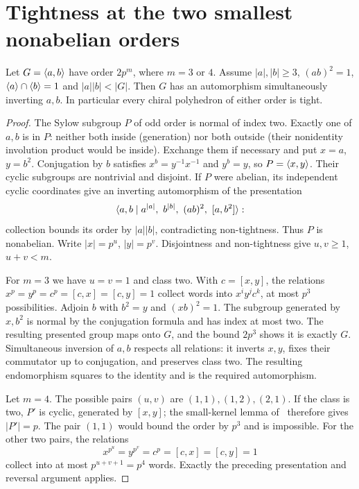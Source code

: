 \section{Tightness at the two smallest nonabelian orders}
\begin{theorem}\label{thm:small}
Let $G=\langle a,b\rangle$ have order $2p^m$, where $m=3$ or $4$.
Assume $|a|,|b|\geq3$, $(ab)^2=1$,
$\langle a\rangle\cap\langle b\rangle=1$ and $|a||b|<|G|$.
Then $G$ has an automorphism simultaneously inverting $a,b$.
In particular every chiral polyhedron of either order is tight.
\end{theorem}
\begin{proof}
The Sylow subgroup $P$ of odd order is normal of index two.
Exactly one of $a,b$ is in $P$: neither both inside (generation)
nor both outside (their nonidentity involution product would be
inside). Exchange them if necessary and put $x=a$, $y=b^2$.
Conjugation by $b$ satisfies $x^b=y^{-1}x^{-1}$ and $y^b=y$,
so $P=\langle x,y\rangle$. Their cyclic subgroups are nontrivial and disjoint.
If $P$ were abelian, its independent cyclic coordinates give an
inverting automorphism of the presentation
\[
\gen{a,b\mid a^{|a|},\ b^{|b|},\ (ab)^2,\ [a,b^2]}:
\]
collection bounds its order by $|a||b|$, contradicting non-tightness.
Thus $P$ is nonabelian. Write $|x|=p^u$, $|y|=p^v$.
Disjointness and non-tightness give $u,v\geq1$, $u+v<m$.

For $m=3$ we have $u=v=1$ and class two. With $c=[x,y]$,
the relations $x^p=y^p=c^p=[c,x]=[c,y]=1$ collect words into
$x^iy^jc^k$, at most $p^3$ possibilities. Adjoin $b$ with
$b^2=y$ and $(xb)^2=1$. The subgroup generated by $x,b^2$
is normal by the conjugation formula and has index at most two.
The resulting presented group maps onto $G$, and the bound $2p^3$
shows it is exactly $G$. Simultaneous inversion of $a,b$ respects
all relations: it inverts $x,y$, fixes their commutator up to
conjugation, and preserves class two. The resulting endomorphism
squares to the identity and is the required automorphism.

Let $m=4$. The possible pairs $(u,v)$ are $(1,1),(1,2),(2,1)$.
If the class is two, $P'$ is cyclic, generated by $[x,y]$;
the small-kernel lemma of~\cite{UF} therefore gives $|P'|=p$.
The pair $(1,1)$ would bound the order by $p^3$ and is impossible.
For the other two pairs, the relations
\[
x^{p^u}=y^{p^v}=c^p=[c,x]=[c,y]=1
\]
collect into at most $p^{u+v+1}=p^4$ words. Exactly the preceding
presentation and reversal argument applies.


\end{proof}
